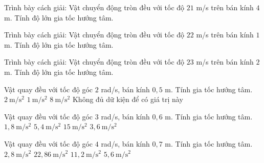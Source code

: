 \begin{bt}
Trình bày cách giải: Vật chuyển động tròn đều với tốc độ $21$ m/s trên bán kính $4$ m. Tính độ lớn gia tốc hướng tâm.
\end{bt}

\begin{bt}
Trình bày cách giải: Vật chuyển động tròn đều với tốc độ $22$ m/s trên bán kính $1$ m. Tính độ lớn gia tốc hướng tâm.
\end{bt}

\begin{bt}
Trình bày cách giải: Vật chuyển động tròn đều với tốc độ $23$ m/s trên bán kính $2$ m. Tính độ lớn gia tốc hướng tâm.
\end{bt}

\begin{ex}
Vật quay đều với tốc độ góc $2$ rad/s, bán kính $0,5$ m. Tính gia tốc hướng tâm.
\choice
{\True $2\ \mathrm{m/s^2}$}
{$1\ \mathrm{m/s^2}$}
{$8\ \mathrm{m/s^2}$}
{Không đủ dữ kiện để có giá trị này}
\end{ex}

\begin{ex}
Vật quay đều với tốc độ góc $3$ rad/s, bán kính $0,6$ m. Tính gia tốc hướng tâm.
\choice
{$1,8\ \mathrm{m/s^2}$}
{\True $5,4\ \mathrm{m/s^2}$}
{$15\ \mathrm{m/s^2}$}
{$3,6\ \mathrm{m/s^2}$}
\end{ex}

\begin{ex}
Vật quay đều với tốc độ góc $4$ rad/s, bán kính $0,7$ m. Tính gia tốc hướng tâm.
\choice
{$2,8\ \mathrm{m/s^2}$}
{$22,86\ \mathrm{m/s^2}$}
{\True $11,2\ \mathrm{m/s^2}$}
{$5,6\ \mathrm{m/s^2}$}
\end{ex}

